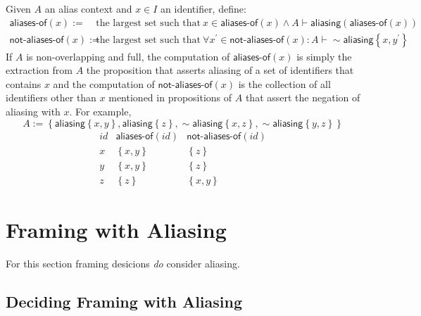 \documentclass{article}
\newcommand{\tsf}{\textsf}
\newcommand{\tit}{\textit}
\newcommand{\set}[1]{\left\{ #1 \right\}}
\newcommand{\p}{^\prime}
\newcommand{\entails}{\vdash}
\newcommand{\pnot}{\sim}
\newcommand{\aliasing}{\tsf{aliasing}}
\begin{document}
Given $A$ an alias context and $x \in I$ an identifier, define:
\begin{align*}
  \tsf{aliases-of}(x)
  := & \
  \text{the largest set such that} \
  x \in \tsf{aliases-of}(x) \land A \entails \aliasing (\tsf{aliases-of}(x))
  \\
  \tsf{not-aliases-of}(x)
  := & \
  \text{the largest set such that} \
  \forall x\p \in \tsf{not-aliases-of}(x) : A \entails \pnot \aliasing\set{x,y\p}
\end{align*}
If $A$ is non-overlapping and full,
the computation of $\tsf{aliases-of}(x)$ is simply the extraction from $A$ the proposition that asserts aliasing of a set of identifiers that contains $x$
and the computation of $\tsf{not-aliases-of}(x)$ is the collection of all identifiers other than $x$ mentioned in propositions of $A$ that assert the negation of aliasing with $x$. For example,
$$
A := \set{ \aliasing\set{x,y}, \aliasing\set{z}, \pnot\aliasing\set{x,z}, \pnot\aliasing\set{y,z} }
$$
$$
\begin{array}{c|c|c}
\tit{id} & \tsf{aliases-of}(\tit{id}) & \tsf{not-aliases-of}(\tit{id})
\\ \hline
x & \set{x,y} & \set{z} \\
y & \set{x,y} & \set{z} \\
z & \set{z}   & \set{x,y}
\end{array}
$$

\newpage
\section{Framing with Aliasing}

For this section framing desicions \tit{do} consider aliasing.

\subsection{Deciding Framing with Aliasing}
\end{document}
